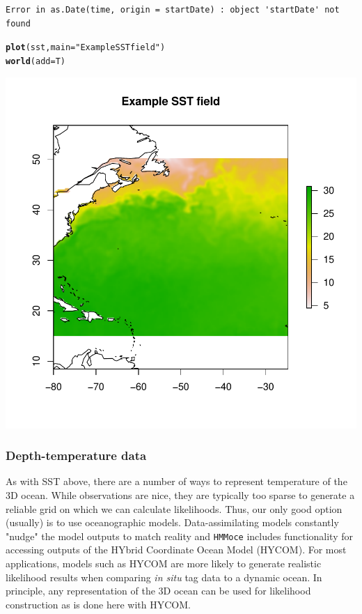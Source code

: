 \documentclass{article}\usepackage[]{graphicx}\usepackage[]{color}
\makeatletter
\def\maxwidth{ %
  \ifdim\Gin@nat@width>\linewidth
    \linewidth
  \else
    \Gin@nat@width
  \fi
}
\newcommand{\hlstr}[1]{\textcolor[rgb]{0.192,0.494,0.8}{#1}}%
\newcommand{\hlstd}[1]{\textcolor[rgb]{0.345,0.345,0.345}{#1}}%
\newcommand{\hlkwc}[1]{\textcolor[rgb]{0.333,0.667,0.333}{#1}}%
\newcommand{\hlkwd}[1]{\textcolor[rgb]{0.737,0.353,0.396}{\textbf{#1}}}%
\newenvironment{kframe}{%
 \def\at@end@of@kframe{}%
 \ifinner\ifhmode%
  \def\at@end@of@kframe{\end{minipage}}%
  \begin{minipage}{\columnwidth}%
 \fi\fi%
 \def\FrameCommand##1{\hskip\@totalleftmargin \hskip-\fboxsep
 \colorbox{shadecolor}{##1}\hskip-\fboxsep
     \hskip-\linewidth \hskip-\@totalleftmargin \hskip\columnwidth}%
 \MakeFramed {\advance\hsize-\width
   \@totalleftmargin\z@ \linewidth\hsize
   \@setminipage}}%
 {\par\unskip\endMakeFramed%
 \at@end@of@kframe}
\newenvironment{knitrout}{}{} %
\makeatother
\begin{document}
\begin{knitrout}
\begin{kframe}
{\ttfamily\noindent\itshape\color{messagecolor}{Loading required namespace: ncdf4}}\begin{verbatim}
Error in as.Date(time, origin = startDate) : object 'startDate' not found
\end{verbatim}
\begin{alltt}
\hlkwd{plot}\hlstd{(sst,} \hlkwc{main} \hlstd{=} \hlstr{"Example SST field"}\hlstd{)}
\hlkwd{world}\hlstd{(}\hlkwc{add} \hlstd{= T)}
\end{alltt}
\end{kframe}
\includegraphics[width=\maxwidth]{figure/env-sst-1} 

\end{knitrout}

\subsubsection{Depth-temperature data}

As with SST above, there are a number of ways to represent temperature of the 3D ocean. While observations are nice, they are typically too sparse to generate a reliable grid on which we can calculate likelihoods. Thus, our only good option (usually) is to use oceanographic models. Data-assimilating models constantly "nudge" the model outputs to match reality and \texttt{HMMoce} includes functionality for accessing outputs of the HYbrid Coordinate Ocean Model (HYCOM). For most applications, models such as HYCOM are more likely to generate realistic likelihood results when comparing \textit{in situ} tag data to a dynamic ocean. In principle, any representation of the 3D ocean can be used for likelihood construction as is done here with HYCOM.
\end{document}
